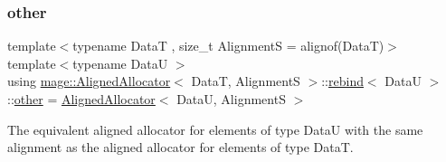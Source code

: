 \subsubsection{\texorpdfstring{other}{other}}
{\footnotesize\ttfamily template$<$typename DataT , size\+\_\+t AlignmentS = alignof(\+Data\+T)$>$ \\
template$<$typename DataU $>$ \\
using \hyperlink{classmage_1_1_aligned_allocator}{mage\+::\+Aligned\+Allocator}$<$ DataT, AlignmentS $>$\+::\hyperlink{structmage_1_1_aligned_allocator_1_1rebind}{rebind}$<$ DataU $>$\+::\hyperlink{structmage_1_1_aligned_allocator_1_1rebind_aeb2e9c9add001b8f603f5b67ad8fee56}{other} =  \hyperlink{classmage_1_1_aligned_allocator}{Aligned\+Allocator}$<$ DataU, AlignmentS $>$}

The equivalent aligned allocator for elements of type {\ttfamily DataU} with the same alignment as the aligned allocator for elements of type {\ttfamily DataT}. 